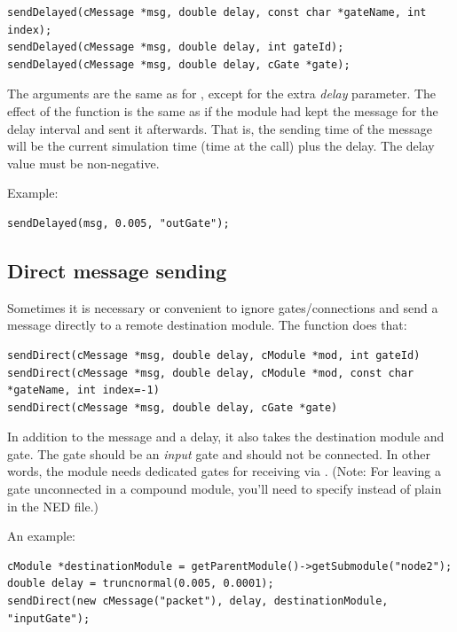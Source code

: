 \begin{verbatim}
sendDelayed(cMessage *msg, double delay, const char *gateName, int index);
sendDelayed(cMessage *msg, double delay, int gateId);
sendDelayed(cMessage *msg, double delay, cGate *gate);
\end{verbatim}

The arguments are the same as for , except for the extra \textit{delay}
parameter. The effect of the function is the same as if the module
had kept the message for the delay interval and sent it afterwards.
That is, the sending time of the message will be the current
simulation time (time at the  call) plus the delay.
The delay value must be non-negative.

Example:

\begin{verbatim}
sendDelayed(msg, 0.005, "outGate");
\end{verbatim}



\subsection{Direct message sending}
\label{sec:simple-modules:direct-sending}

Sometimes it is necessary or convenient to ignore gates/connections
and send a message directly to a remote destination module. The 
function does that:

\begin{verbatim}
sendDirect(cMessage *msg, double delay, cModule *mod, int gateId)
sendDirect(cMessage *msg, double delay, cModule *mod, const char *gateName, int index=-1)
sendDirect(cMessage *msg, double delay, cGate *gate)
\end{verbatim}

In addition to the message and a delay, it also takes the destination module
and gate. The gate should be an \textit{input} gate and should not be connected.
In other words, the module needs dedicated gates for receiving via .
(Note: For leaving a gate unconnected in a compound module, you'll need to specify
 instead of plain  in the NED file.)

An example:

\begin{verbatim}
cModule *destinationModule = getParentModule()->getSubmodule("node2");
double delay = truncnormal(0.005, 0.0001);
sendDirect(new cMessage("packet"), delay, destinationModule, "inputGate");
\end{verbatim}

